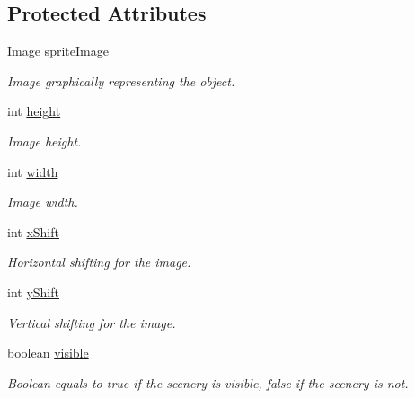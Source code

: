 \subsection*{Protected Attributes}
\begin{DoxyCompactItemize}
\item 
Image \hyperlink{classworld_1_1scenery_1_1_scenery_a512d9c0a154e6843389e343d80843326}{sprite\-Image}
\begin{DoxyCompactList}\small\item\em Image graphically representing the object. \end{DoxyCompactList}\item 
int \hyperlink{classworld_1_1scenery_1_1_scenery_a54b4edfa060087e78a829105bf62a900}{height}
\begin{DoxyCompactList}\small\item\em Image height. \end{DoxyCompactList}\item 
int \hyperlink{classworld_1_1scenery_1_1_scenery_ad10b27080954e2fc06aa1718f47c4ce1}{width}
\begin{DoxyCompactList}\small\item\em Image width. \end{DoxyCompactList}\item 
int \hyperlink{classworld_1_1scenery_1_1_scenery_a0999f105f7630fd67fd9d440da6983aa}{x\-Shift}
\begin{DoxyCompactList}\small\item\em Horizontal shifting for the image. \end{DoxyCompactList}\item 
int \hyperlink{classworld_1_1scenery_1_1_scenery_ac9ca2c17cf6920deffe490c013b0e638}{y\-Shift}
\begin{DoxyCompactList}\small\item\em Vertical shifting for the image. \end{DoxyCompactList}\item 
boolean \hyperlink{classworld_1_1scenery_1_1_scenery_a7b22a78d3126c947b7010fdbbea02218}{visible}
\begin{DoxyCompactList}\small\item\em Boolean equals to true if the scenery is visible, false if the scenery is not. \end{DoxyCompactList}\end{DoxyCompactItemize}
